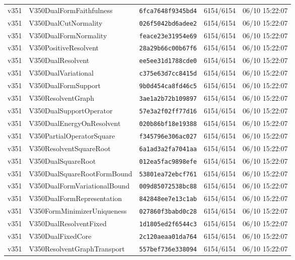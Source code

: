 \documentclass[11pt]{article}
\theoremstyle{definition}\newtheorem{deriv}{Derivation}
\begin{document}
{\begin{longtable}{@{}lllll@{}}
v351 & V350DualFormFaithfulness & \texttt{6fca7648f9345bd4} & 6154/6154 & 06/10 15:22:07 \\
v351 & V350DualCutNormality & \texttt{026f5042bd6adee2} & 6154/6154 & 06/10 15:22:07 \\
v351 & V350DualFormNormality & \texttt{feace23e31954e69} & 6154/6154 & 06/10 15:22:07 \\
v351 & V350PositiveResolvent & \texttt{28a29b66c00b67f6} & 6154/6154 & 06/10 15:22:07 \\
v351 & V350DualResolvent & \texttt{ee5ee31d1788cde0} & 6154/6154 & 06/10 15:22:07 \\
v351 & V350DualVariational & \texttt{c375e63d7cc8415d} & 6154/6154 & 06/10 15:22:07 \\
v351 & V350DualFormSupport & \texttt{9b0d454ca8fd46c5} & 6154/6154 & 06/10 15:22:07 \\
v351 & V350ResolventGraph & \texttt{3ae1a2b72b109897} & 6154/6154 & 06/10 15:22:07 \\
v351 & V350DualSupportOperator & \texttt{57e3a2f02ff77d16} & 6154/6154 & 06/10 15:22:07 \\
v351 & V350DualEnergyOnResolvent & \texttt{020b86bf18e19388} & 6154/6154 & 06/10 15:22:07 \\
v351 & V350PartialOperatorSquare & \texttt{f345796e306ac027} & 6154/6154 & 06/10 15:22:07 \\
v351 & V350ResolventSquareRoot & \texttt{6a1ad3a2fa7041aa} & 6154/6154 & 06/10 15:22:07 \\
v351 & V350DualSquareRoot & \texttt{012ea5fac9898efe} & 6154/6154 & 06/10 15:22:07 \\
v351 & V350DualSquareRootFormBound & \texttt{53801ea72ebcf761} & 6154/6154 & 06/10 15:22:07 \\
v351 & V350DualFormVariationalBound & \texttt{009d85072538bc88} & 6154/6154 & 06/10 15:22:07 \\
v351 & V350DualFormRepresentation & \texttt{842848ee7e13c1ab} & 6154/6154 & 06/10 15:22:07 \\
v351 & V350FormMinimizerUniqueness & \texttt{027860f3babd0c28} & 6154/6154 & 06/10 15:22:07 \\
v351 & V350DualResolventFixed & \texttt{1d1805ed2f6544c3} & 6154/6154 & 06/10 15:22:07 \\
v351 & V350DualFixedCore & \texttt{2c120aeaa01da764} & 6154/6154 & 06/10 15:22:07 \\
v351 & V350ResolventGraphTransport & \texttt{557bef736e338094} & 6154/6154 & 06/10 15:22:07 \\

\end{longtable}}
\end{document}
